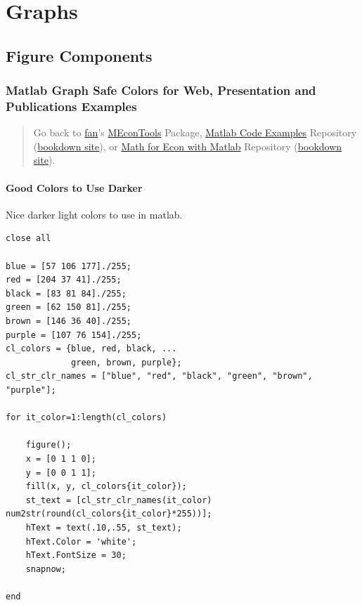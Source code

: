 \documentclass[
]{book}
\begin{document}
\hypertarget{graphs}{%
\chapter{Graphs}\label{graphs}}

\hypertarget{figure-components}{%
\section{Figure Components}\label{figure-components}}

\hypertarget{matlab-graph-safe-colors-for-web-presentation-and-publications-examples}{%
\subsection{Matlab Graph Safe Colors for Web, Presentation and Publications Examples}\label{matlab-graph-safe-colors-for-web-presentation-and-publications-examples}}

\begin{quote}
Go back to \href{http://fanwangecon.github.io/}{fan}'s \href{https://fanwangecon.github.io/MEconTools/}{MEconTools} Package, \href{https://fanwangecon.github.io/M4Econ/}{Matlab Code Examples} Repository (\href{https://fanwangecon.github.io/M4Econ/bookdown}{bookdown site}), or \href{https://fanwangecon.github.io/Math4Econ/}{Math for Econ with Matlab} Repository (\href{https://fanwangecon.github.io/Math4Econ/bookdown}{bookdown site}).
\end{quote}

\hypertarget{good-colors-to-use-darker}{%
\subsubsection{Good Colors to Use Darker}\label{good-colors-to-use-darker}}

Nice darker light colors to use in matlab.

\begin{verbatim}
close all

blue = [57 106 177]./255;
red = [204 37 41]./255;
black = [83 81 84]./255;
green = [62 150 81]./255;
brown = [146 36 40]./255;
purple = [107 76 154]./255;
cl_colors = {blue, red, black, ...
             green, brown, purple};
cl_str_clr_names = ["blue", "red", "black", "green", "brown", "purple"];

for it_color=1:length(cl_colors)
    
    figure();
    x = [0 1 1 0];
    y = [0 0 1 1];
    fill(x, y, cl_colors{it_color});
    st_text = [cl_str_clr_names(it_color) num2str(round(cl_colors{it_color}*255))];
    hText = text(.10,.55, st_text);
    hText.Color = 'white';
    hText.FontSize = 30; 
    snapnow;
    
end
\end{verbatim}
\end{document}
